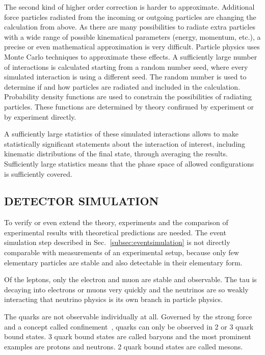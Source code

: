 \documentclass{wscpaperproc}
\theoremstyle{wsc}
\begin{document}
The second kind of higher order correction is harder to approximate. Additional force particles radiated from the incoming or outgoing particles are changing the calculation from above. As there are many possibilities to radiate extra particles with a wide range of possible kinematical parameters (energy, momentum, etc.), a precise or even mathematical approximation is very difficult. Particle physics uses Monte Carlo techniques to approximate these effects. A sufficiently large number of interactions is calculated starting from a random number seed, where every simulated interaction is using a different seed. The random number is used to determine if and how particles are radiated and included in the calculation. Probability density functions are used to constrain the possibilities of radiating particles. These functions are determined by theory confirmed by experiment or by experiment directly.

A sufficiently large statistics of these simulated interactions allows to make statistically significant statements about the interaction of interest, including kinematic distributions of the final state, through averaging the results. Sufficiently large statistics means that the phase space of allowed configurations is sufficiently covered.

\subsection{DETECTOR SIMULATION} 
\label{subsec:detectorsimulation}

To verify or even extend the theory, experiments and the comparison of experimental results with theoretical predictions are needed. The event simulation step described in Sec.~\ref{subsec:eventsimulation} is not directly comparable with measurements of an experimental setup, because only few elementary particles are stable and also detectable in their elementary form.

Of the leptons, only the electron and muon are stable and observable. The tau is decaying into electrons or muons very quickly and the neutrinos are so weakly interacting that neutrino physics is its own branch in particle physics. 

The quarks are not observable individually at all. Governed by the strong force and a concept called confinement~, quarks can only be observed in 2 or 3 quark bound states. 3 quark bound states are called baryons and the most prominent examples are protons and neutrons. 2 quark bound states are called mesons. 
\end{document}
